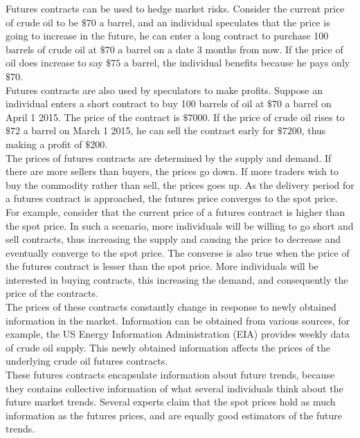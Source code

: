 \documentclass[runningheads]{llncs}
\begin{document}
\noindent Futures contracts can be used to hedge market risks. Consider the current price of crude oil to be $\$70$ a barrel, and an individual speculates that the price is going to increase in the future, he can enter a long contract to purchase 100 barrels of crude oil at $\$70$ a barrel on a date 3 months from now. If the price of oil does increase to say $\$75$ a barrel, the individual benefits because he pays only $\$70$.\\

\noindent Futures contracts are also used by speculators to make profits. Suppose an individual enters a short contract to buy 100 barrels of oil at $\$70$ a barrel on April 1 2015. The price of the contract is $\$7000$. If the price of crude oil rises to $\$72$ a barrel on March 1 2015, he can sell the contract early for $\$7200$, thus making a profit of $\$200$. \\

\noindent The prices of futures contracts are determined by the supply and demand. If there are more sellers than buyers, the prices go down. If more traders wish to buy the commodity rather than sell, the prices goes up. As the delivery period for a futures contract is approached, the futures price converges to the spot price. For example, consider that the current price of a futures contract is higher than the spot price. In such a scenario, more individuals will be willing to go short and sell contracts, thus increasing the supply and causing the price to decrease and eventually converge to the spot price. The converse is also true when the price of the futures contract is lesser than the spot price. More individuals will be interested in buying contracts, this increasing the demand, and consequently the price of the contracts. \\
 
\noindent The prices of these contracts constantly change in response to newly obtained information in the market. Information can be obtained from various sources, for example, the US Energy Information Administration (EIA) provides weekly data of crude oil supply. This newly obtained information affects the prices of the underlying crude oil futures contracts. \\

\noindent These futures contracts encapsulate information about future trends, because they contains collective information of what several individuals think about the future market trends. Several experts claim that the spot prices hold as much information as the futures prices, and are equally good estimators of the future trends. 
\end{document}

